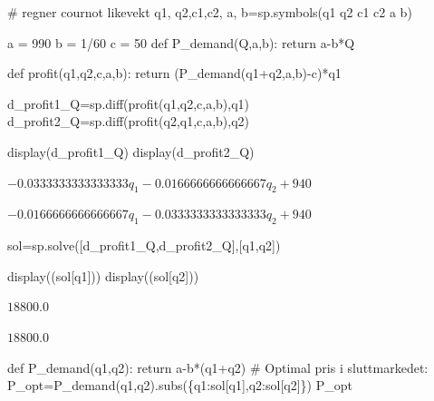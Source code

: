 \documentclass[
  12pt,
  a4paper,
  DIV=11,
  numbers=noendperiod]{scrartcl}
\newenvironment{Shaded}{\begin{snugshade}}{\end{snugshade}}
\newcommand{\CommentTok}[1]{\textcolor[rgb]{0.37,0.37,0.37}{#1}}
\newcommand{\ControlFlowTok}[1]{\textcolor[rgb]{0.00,0.23,0.31}{#1}}
\newcommand{\DecValTok}[1]{\textcolor[rgb]{0.68,0.00,0.00}{#1}}
\newcommand{\KeywordTok}[1]{\textcolor[rgb]{0.00,0.23,0.31}{#1}}
\newcommand{\NormalTok}[1]{\textcolor[rgb]{0.00,0.23,0.31}{#1}}
\newcommand{\OperatorTok}[1]{\textcolor[rgb]{0.37,0.37,0.37}{#1}}
\newcommand{\StringTok}[1]{\textcolor[rgb]{0.13,0.47,0.30}{#1}}
\begin{document}
\begin{Shaded}
\begin{Highlighting}[]
\CommentTok{\# regner cournot likevekt}
\NormalTok{q1, q2,c1,c2, a, b}\OperatorTok{=}\NormalTok{sp.symbols(}\StringTok{\textquotesingle{}q1 q2 c1 c2 a b\textquotesingle{}}\NormalTok{)}

\NormalTok{a }\OperatorTok{=} \DecValTok{990}
\NormalTok{b }\OperatorTok{=} \DecValTok{1}\OperatorTok{/}\DecValTok{60}
\NormalTok{c }\OperatorTok{=} \DecValTok{50}
\KeywordTok{def}\NormalTok{ P\_demand(Q,a,b):}
    \ControlFlowTok{return}\NormalTok{ a}\OperatorTok{{-}}\NormalTok{b}\OperatorTok{*}\NormalTok{Q}

\KeywordTok{def}\NormalTok{ profit(q1,q2,c,a,b):}
    \ControlFlowTok{return}\NormalTok{ (P\_demand(q1}\OperatorTok{+}\NormalTok{q2,a,b)}\OperatorTok{{-}}\NormalTok{c)}\OperatorTok{*}\NormalTok{q1}
\end{Highlighting}
\end{Shaded}

\begin{Shaded}
\begin{Highlighting}[]
\NormalTok{d\_profit1\_Q}\OperatorTok{=}\NormalTok{sp.diff(profit(q1,q2,c,a,b),q1)}
\NormalTok{d\_profit2\_Q}\OperatorTok{=}\NormalTok{sp.diff(profit(q2,q1,c,a,b),q2)}

\NormalTok{display(d\_profit1\_Q)}
\NormalTok{display(d\_profit2\_Q)}
\end{Highlighting}
\end{Shaded}

$\displaystyle - 0.0333333333333333 q_{1} - 0.0166666666666667 q_{2} + 940$

$\displaystyle - 0.0166666666666667 q_{1} - 0.0333333333333333 q_{2} + 940$

\begin{Shaded}
\begin{Highlighting}[]
\NormalTok{sol}\OperatorTok{=}\NormalTok{sp.solve([d\_profit1\_Q,d\_profit2\_Q],[q1,q2])}

\NormalTok{display((sol[q1]))}
\NormalTok{display((sol[q2]))}
\end{Highlighting}
\end{Shaded}

$\displaystyle 18800.0$

$\displaystyle 18800.0$

\begin{Shaded}
\begin{Highlighting}[]
\KeywordTok{def}\NormalTok{ P\_demand(q1,q2):}
    \ControlFlowTok{return}\NormalTok{ a}\OperatorTok{{-}}\NormalTok{b}\OperatorTok{*}\NormalTok{(q1}\OperatorTok{+}\NormalTok{q2)}
\CommentTok{\# Optimal pris i sluttmarkedet:}
\NormalTok{P\_opt}\OperatorTok{=}\NormalTok{P\_demand(q1,q2).subs(\{q1:sol[q1],q2:sol[q2]\})}
\NormalTok{P\_opt}
\end{Highlighting}
\end{Shaded}
\end{document}
